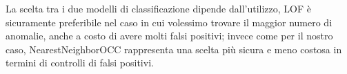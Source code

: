La scelta tra i due modelli di classificazione dipende dall'utilizzo, LOF è sicuramente preferibile nel caso in cui volessimo trovare il maggior numero di anomalie, anche a costo di avere molti falsi positivi; invece come per il nostro caso, NearestNeighborOCC rappresenta una scelta più sicura e meno costosa in termini di controlli di falsi positivi.



